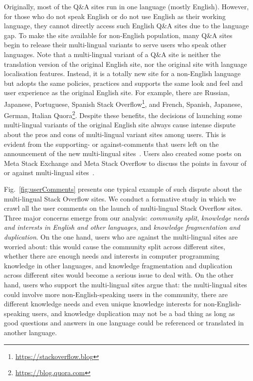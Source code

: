 Originally, most of the Q\&A sites run in one language (mostly English).
However, %
for those who do not speak English or do not use English as their working language, they cannot directly access such English Q\&A sites due to the language gap.
To make the site available for non-English population, many Q\&A sites begin to release their multi-lingual variants to serve users who speak other languages.
Note that a multi-lingual variant of a Q\&A site is neither the translation version of the original English site, nor the original site with language localisation features.
Instead, it is a totally new site for a non-English language but adopts the same policies, practices and supports the same look and feel and user experience as the original English site.
For example, there are Russian, Japanese, Portuguese, Spanish Stack Overflow\footnote{\url{https://stackoverflow.blog}}, and French, Spanish, Japanese, German, Italian Quora\footnote{\url{https://blog.quora.com}}.
Despite these benefits, the decisions of launching some multi-lingual variants of the original English site always cause intense dispute about the pros and cons of multi-lingual variant sites among users.
This is evident from the supporting- or against-comments that users left on the announcement of the new multi-lingual sites~\cite{web:SOjapanese, web:SOportugese1, web:SOportugese2, web:SOrussian, web:SOspanish}.
Users also created some posts on Meta Stack Exchange and Meta Stack Overflow to discuss the points in favour of or against multi-lingual sites~\cite{web:SOdiscussion1, web:SOdiscussion2, web:SOdiscussion3, web:SOdiscussion4, web:SOdiscussion5, web:SOdiscussion6, web:QuoraDiscussion}.

Fig.~\ref{fig:userComments} presents one typical example of such dispute about the multi-lingual Stack Overflow sites.
We conduct a formative study in which we crawl all the user comments on the launch of multi-lingual Stack Overflow sites.
Three major concerns emerge from our analysis: 
\textit{community split}, \textit{knowledge needs and interests in English and other languages}, and \textit{knowledge fragmentation and duplication}.
On the one hand, users who are against the multi-lingual sites are worried about: this would cause the community split across different sites, whether there are enough needs and interests in computer programming knowledge in other languages, and knowledge fragmentation and duplication across different sites would become a serious issue to deal with.
On the other hand, users who support the multi-lingual sites argue that: the multi-lingual sites could involve more non-English-speaking users in the community, there are different knowledge needs and even unique knowledge interests for non-English-speaking users, and knowledge duplication may not be a bad thing as long as good questions and answers in one language could be referenced or translated in another language.
  
